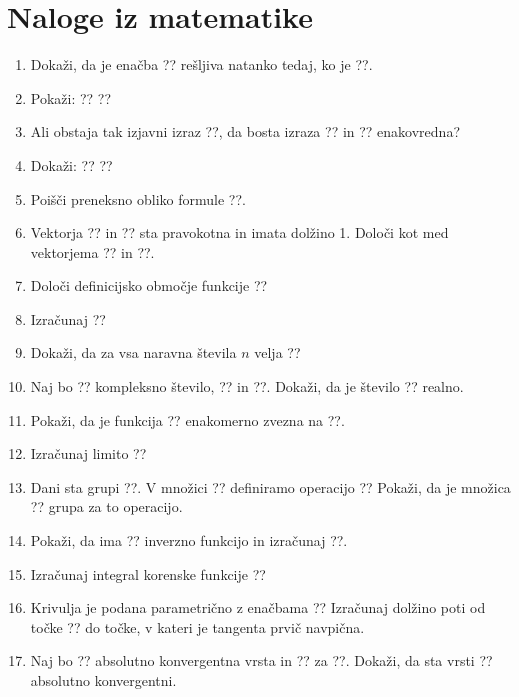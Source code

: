\documentclass[a4paper,12pt]{article}
\begin{document}
\section*{Naloge iz matematike}
\begin{enumerate}
\item
Dokaži, da je enačba ??
rešljiva natanko tedaj, ko je ??.

\item
Pokaži:
??
??

\item
Ali obstaja tak izjavni izraz ??, da bosta izraza
?? in ??
enakovredna?

\item
Dokaži:
??
??

\item
Poišči preneksno obliko formule ??.

\item
Vektorja ?? in ??
sta pravokotna in imata dolžino 1. Določi kot med vektorjema ?? in ??.

\item
Določi definicijsko območje funkcije
??

\item
Izračunaj
??

\item
Dokaži, da za vsa naravna števila $n$ velja
??

\item
Naj bo ?? kompleksno število, ?? in ??.
Dokaži, da je število ?? realno.

\item
Pokaži, da je funkcija ?? enakomerno zvezna na ??.

\item
Izračunaj limito
??

\item
Dani sta grupi ??. V množici ?? definiramo operacijo
??
Pokaži, da je množica ?? grupa za to operacijo.

\item
Pokaži, da ima ?? inverzno funkcijo in izračunaj ??.

\item
Izračunaj integral korenske funkcije
??

\item
Krivulja je podana parametrično z enačbama
??
Izračunaj dolžino poti od točke ?? do točke, v kateri je tangenta prvič navpična.

\item
Naj bo ?? absolutno konvergentna vrsta in ?? za ??.
Dokaži, da sta vrsti
??
absolutno konvergentni.


\end{enumerate}
\end{document}
